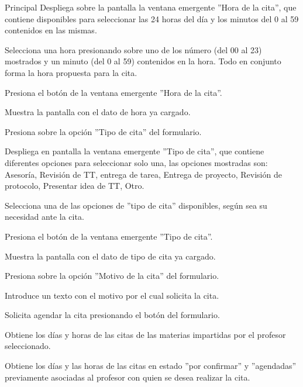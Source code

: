 \begin{UCtrayectoria}{Principal}
	\UCpaso Despliega sobre la pantalla la ventana emergente ''Hora de la cita'', que contiene disponibles para seleccionar las 24 horas del día y los minutos del 0 al 59 contenidos en las mismas.

	\UCpaso [\UCactor] Selecciona una hora presionando sobre uno de los número (del 00 al 23) mostrados y un minuto (del 0 al 59) contenidos en la hora. Todo en conjunto forma la hora propuesta para la cita.

	\UCpaso [\UCactor] Presiona el botón  de la ventana emergente ''Hora de la cita''. 

	\UCpaso Muestra la pantalla  con el dato de hora ya cargado.

	\UCpaso [\UCactor] Presiona sobre la opción ''Tipo de cita'' del formulario. \label{l_EM_Citas_CU2_tipoCita} 

	\UCpaso Despliega en pantalla la ventana emergente ''Tipo de cita'', que contiene diferentes opciones para seleccionar solo una, las opciones mostradas son: Asesoría, Revisión de TT, entrega de tarea, Entrega de proyecto, Revisión de protocolo, Presentar idea de TT, Otro.

	\UCpaso [\UCactor] Selecciona una de las opciones de ''tipo de cita'' disponibles, según sea su necesidad ante la cita.

	\UCpaso [\UCactor] Presiona el botón  de la ventana emergente ''Tipo de cita''. 

	\UCpaso Muestra la pantalla  con el dato de tipo de cita ya cargado.

	\UCpaso [\UCactor] Presiona sobre la opción ''Motivo de la cita'' del formulario.

	\UCpaso [\UCactor] Introduce un texto con el motivo por el cual solicita la cita.

	\UCpaso [\UCactor] Solicita agendar la cita presionando el botón  del formulario.

	\UCpaso Obtiene los días y horas de las citas de las materias impartidas por el profesor seleccionado.

	\UCpaso Obtiene los días y las horas de las citas en estado ''por confirmar'' y ''agendadas'' previamente asociadas al profesor con quien se desea realizar la cita.


\end{UCtrayectoria}
